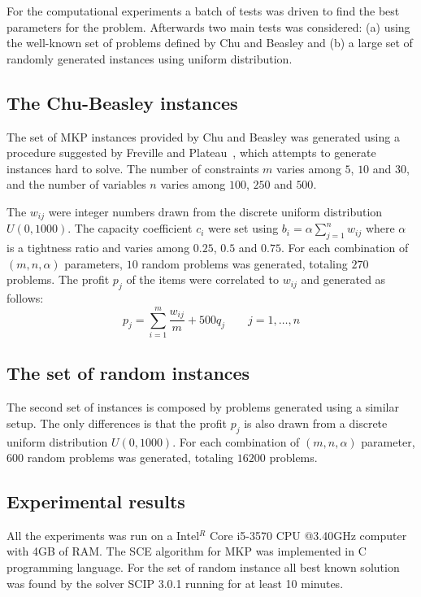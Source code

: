 For the computational experiments a batch of tests was driven to find the best
parameters for the problem.
Afterwards two main tests was considered:
(a) using the well-known set of problems defined by Chu and Beasley \cite{Chu-Beasley-1998}
and (b) a large set of randomly generated instances using uniform distribution.

\subsection{The Chu-Beasley instances}

The set of MKP instances provided by Chu and Beasley was generated using a
procedure suggested by Freville and Plateau~\cite{freville1994efficient}, which
attempts to generate instances hard to solve.
The number of constraints $m$ varies among $5$, $10$ and $30$, and the number
of variables $n$ varies among $100$, $250$ and $500$.

The $w_{ij}$ were integer numbers drawn from the discrete uniform distribution
$U(0, 1000)$.
The capacity coefficient $c_i$ were set using
$b_i = \alpha\sum_{j=1}^{n} w_{ij}$ where $\alpha$ is a tightness ratio and
varies among $0.25$, $0.5$ and $0.75$.
For each combination of $(m,n,\alpha)$ parameters, $10$ random problems was generated,
totaling $270$ problems.
The profit $p_j$ of the items were correlated to $w_{ij}$ and generated as follows:
\begin{displaymath}
  p_j = \sum_{i=1}^m \frac{w_{ij}}{m} + 500q_j \qquad j = 1, \ldots, n
\end{displaymath}

\subsection{The set of random instances}

The second set of instances is composed by problems generated using a similar
setup.
The only differences is that the profit $p_j$ is also drawn from a discrete uniform
distribution $U(0, 1000)$.
For each combination of $(m, n, \alpha)$ parameter, $600$ random problems was
generated, totaling $16200$ problems.

\subsection{Experimental results}

All the experiments was run on a Intel$^R$ Core i5-3570 CPU @3.40GHz computer
with 4GB of RAM.
The SCE algorithm for MKP was implemented in C programming language.
For the set of random instance all best known solution was found by the solver
SCIP 3.0.1 running for at least 10 minutes.

